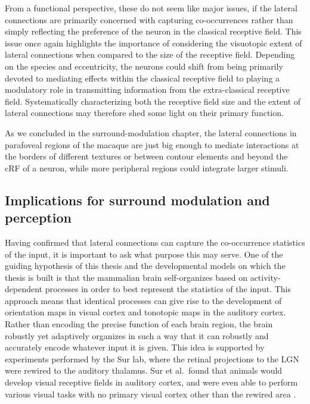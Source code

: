 From a functional perspective, these do not seem like major issues, if
the lateral connections are primarily concerned with capturing
co-occurrences rather than simply reflecting the preference of the
neuron in the classical receptive field. This issue once again
highlights the importance of considering the visuotopic extent of
lateral connections when compared to the size of the receptive
field. Depending on the species and eccentricity, the neurons could
shift from being primarily devoted to mediating effects within the
classical receptive field to playing a modulatory role in transmitting
information from the extra-classical receptive field. Systematically
characterizing both the receptive field size and the extent of lateral
connections may therefore shed some light on their primary function.

As we concluded in the surround-modulation chapter, the lateral
connections in parafoveal regions of the macaque are just big enough
to mediate interactions at the borders of different textures or
between contour elements and beyond the cRF of a neuron, while more
peripheral regions could integrate larger stimuli.

\subsection{Implications for surround modulation and perception}

Having confirmed that lateral connections can capture the
co-occurrence statistics of the input, it is important to ask what
purpose this may serve. One of the guiding hypothesis of this thesis
and the developmental models on which the thesis is built is that the
mammalian brain self-organizes based on activity-dependent processes
in order to best represent the statistics of the input. This approach
means that identical processes can give rise to the development of
orientation maps in visual cortex and tonotopic maps in the auditory
cortex. Rather than encoding the precise function of each brain
region, the brain robustly yet adaptively organizes in such a way that
it can robustly and accurately encode whatever input it is given. This
idea is supported by experiments performed by the Sur lab, where the
retinal projections to the LGN were rewired to the auditory thalamus.
Sur et al.\ found that animals would develop visual receptive fields
in auditory cortex, and were even able to perform various visual tasks
with no primary visual cortex other than the rewired area
\citep{vonMelchner2000}.

